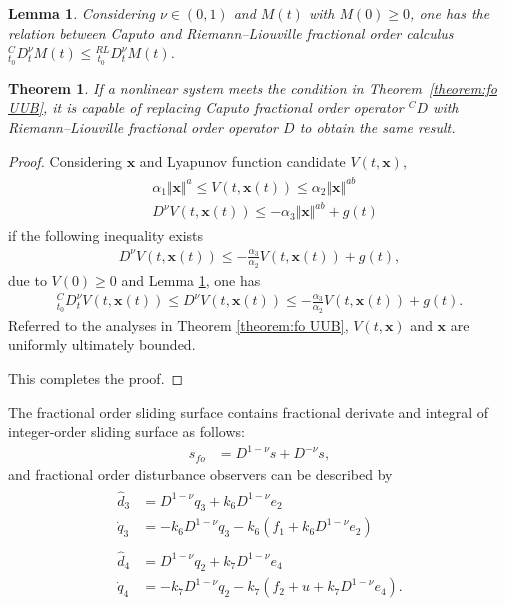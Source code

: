 \documentclass[ShortAfour]{sage}
\theoremstyle{plain}
\newtheorem{mylem}{Lemma}
\newtheorem{mythm}{Theorem}
\theoremstyle{remark}
\begin{document}
\begin{mylem}\label{lemma:C RL ineq}\cite{Li2009}
  Considering $\nu\in(0,1)$ and $M(t)$ with $M(0)\ge 0$, one has the relation between Caputo and Riemann--Liouville fractional order calculus ${}^C_{t_0}D^\nu_t M(t)\le {}^{RL}_{\ t_0}D^\nu_t M(t)$.
\end{mylem}
\begin{mythm}\label{theorem:foD UUB}
  If a nonlinear system meets the condition in Theorem~\ref{theorem:fo UUB}, it is capable of replacing Caputo fractional order operator $^C D$ with Riemann--Liouville fractional order operator $D$ to obtain the same result.
\end{mythm}
\begin{proof}
  Considering $\bm x$ and Lyapunov function candidate $V(t,\bm x)$, 
  \begin{align}
      \begin{split}\label{eq:ML UUB RL}
      &\alpha_1\Vert\bm x\Vert^a\le V(t,\bm x(t))\le\alpha_2\Vert\bm x\Vert^{ab}\\
       &D^\nu V(t,\bm x(t))\le-\alpha_3\Vert\bm x\Vert^{ab}+g(t)
    \end{split}
    \end{align}
  if the following inequality exists
  \begin{align*}
      D^\nu V(t,\bm x(t))\le -\frac{\alpha_3}{\alpha_2}V(t,\bm x(t))+g(t),
  \end{align*}
  due to $V(0)\ge 0$ and Lemma \ref{lemma:C RL ineq}, one has
  \begin{align*}
      ^C_{t_0} D^\nu_t V(t,\bm x(t))\le D^\nu V(t,\bm x(t))\le-\frac{\alpha_3}{\alpha_2}V(t,\bm x(t))+g(t).
  \end{align*}
  Referred to the analyses in Theorem \ref{theorem:fo UUB}, $V(t,\bm x)$ and $\bm x$ are uniformly ultimately bounded. 
  
  This completes the proof.
\end{proof}

The fractional order sliding surface contains fractional derivate and integral of integer-order sliding surface as follows:
\begin{align}
  s_{fo}&=D^{1-\nu}s+D^{-\nu}s,\label{eq:sfo}
\end{align}
and fractional order disturbance observers can be described by
\begin{align}\begin{split}
  \hat d_3 &= D^{1-\nu}q_3+k_6D^{1-\nu}e_2\\
  \dot q_3 &= -k_6D^{1-\nu}q_3-k_6(f_1+k_6D^{1-\nu}e_2)\label{eq:fodo1}
\end{split}\\\begin{split}
  \hat d_4 &= D^{1-\nu}q_2+k_7D^{1-\nu}e_4\\
  \dot q_4 &= -k_7D^{1-\nu}q_2-k_7(f_2+u+k_7D^{1-\nu}e_4).\label{eq:fodo2}
\end{split}\end{align}
\end{document}
